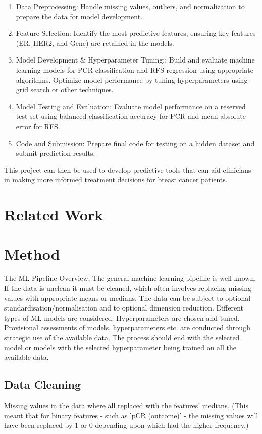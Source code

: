 \documentclass{article}
\begin{document}
\begin{enumerate}
  \item Data Preprocessing: Handle missing values, outliers, and normalization to prepare the data for model development.
  \item Feature Selection: Identify the most predictive features, ensuring key features (ER, HER2, and Gene) are retained in the models.
  \item Model Development \& Hyperparameter Tuning:: Build and evaluate machine learning models for PCR classification and RFS regression using appropriate algorithms. Optimize model performance by tuning hyperparameters using grid search or other techniques.
  \item Model Testing and Evaluation: Evaluate model performance on a reserved test set using balanced classification accuracy for PCR and mean absolute error for RFS.
  \item Code and Submission: Prepare final code for testing on a hidden dataset and submit prediction results.
\end{enumerate}

This project can then be used to develop predictive tools that can aid clinicians in making more informed treatment decisions for breast cancer patients.

\section{Related Work}


\section{Method}

The ML Pipeline Overview; The general machine learning pipeline is well known. If the data is unclean it must be cleaned, which often involves replacing missing values with appropriate means or medians. The data can be subject to optional standardisation/normalisation and to optional dimension reduction.  Different types of ML models are considered. Hyperparameters are chosen and tuned. Provisional assessments of models, hyperparameters etc. are conducted through strategic use of the available data. The process should end with the selected model or models with the selected hyperparameter being trained on all the available data. 

\subsection{Data Cleaning}
Missing values in the data where all replaced with the features' medians. (This meant that for binary features - such as 'pCR (outcome)' - the missing values will have been replaced by 1 or 0 depending upon which had the higher frequency.)  
\end{document}
